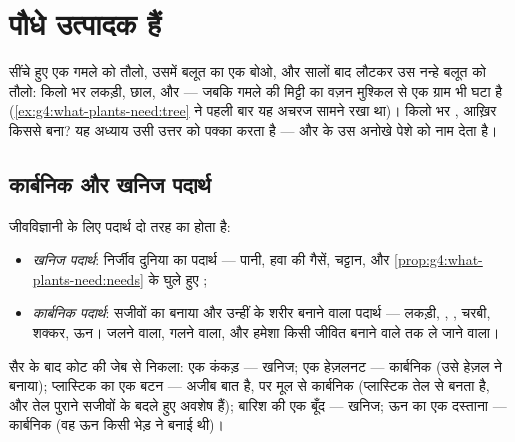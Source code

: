 \chapter{पौधे उत्पादक हैं}\label{ch:g6:plants-are-producers}

सींचे हुए एक गमले को तौलो, उसमें बलूत का एक  बोओ, और सालों बाद लौटकर
उस नन्हे बलूत को तौलो: किलो भर लकड़ी, छाल,  और  --- जबकि गमले की
मिट्टी का वज़न मुश्किल से एक ग्राम भी घटा है
(\cref{ex:g4:what-plants-need:tree} ने पहली बार यह अचरज सामने रखा था)।
किलो भर , आख़िर किससे बना? यह अध्याय उसी उत्तर को पक्का करता है ---
और  के उस अनोखे पेशे को नाम देता है।

\section{कार्बनिक और खनिज पदार्थ}

\begin{definition}[खनिज और कार्बनिक पदार्थ]\label{def:g6:plants-are-producers:matter}
जीवविज्ञानी के लिए पदार्थ दो तरह का होता है:
\begin{itemize}
  \item \emph{खनिज पदार्थ}: निर्जीव दुनिया का
        पदार्थ --- पानी, हवा की गैसें, चट्टान, और
        \cref{prop:g4:what-plants-need:needs} के घुले हुए ;
  \item \emph{कार्बनिक पदार्थ}: सजीवों का बनाया
        और उन्हीं के शरीर बनाने वाला पदार्थ --- लकड़ी, , ,
        चरबी, शक्कर, ऊन। जलने वाला, गलने वाला, और हमेशा किसी जीवित
        बनाने वाले तक ले जाने वाला।
\end{itemize}
\end{definition}

\begin{example}[एक जेब को छाँटना]\label{ex:g6:plants-are-producers:sorting}
सैर के बाद कोट की जेब से निकला: एक कंकड़ --- खनिज; एक हेज़लनट ---
कार्बनिक (उसे हेज़ल ने बनाया); प्लास्टिक का एक बटन --- अजीब बात है, पर
मूल से कार्बनिक (प्लास्टिक तेल से बनता है, और तेल पुराने सजीवों के बदले
हुए अवशेष हैं); बारिश की एक बूँद --- खनिज; ऊन का एक दस्ताना ---
कार्बनिक (वह ऊन किसी भेड़ ने बनाई थी)।
\end{example}

